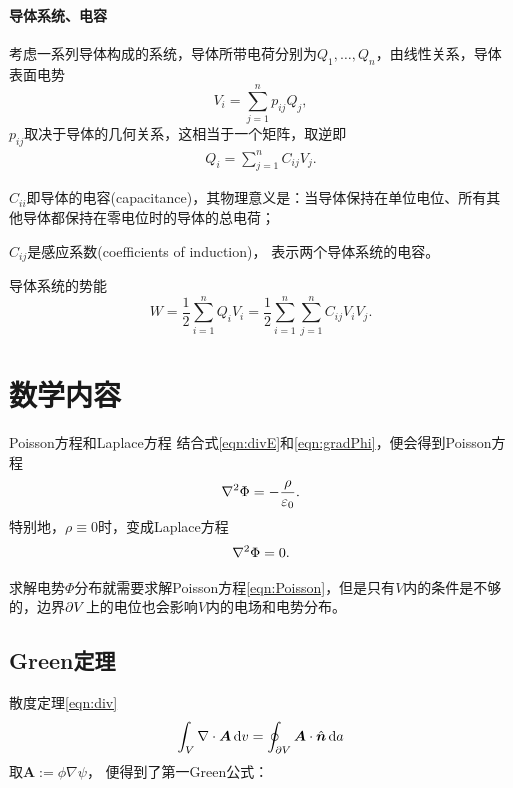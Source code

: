 \paragraph{导体系统、电容}
考虑一系列导体构成的系统，导体所带电荷分别为$Q_1,\ldots,Q_n$，由线性关系，导体表面电势
\[
    V_i=\sum_{j=1}^np_{ij}Q_j,
\]
$p_{ij}$取决于导体的几何关系，这相当于一个矩阵，取逆即
\begin{align}
    Q_i=\sum_{j=1}^nC_{ij}V_j.
\end{align}
\begin{compactitem}
	\item $C_{ii}$即导体的电容(capacitance)，其物理意义是：当导体保持在单位电位、所有其他导体都保持在零电位时的导体的总电荷；
	\item $C_{ij}$是感应系数(coefficients of induction)，%
    表示两个导体系统的电容。
\end{compactitem}
导体系统的势能
\[
    W=\frac12\sum_{i=1}^nQ_iV_i=\frac12\sum_{i=1}^n\sum_{j=1}^nC_{ij}V_iV_j.
\]

\section{数学内容}

\begin{definition}
    {Poisson方程和Laplace方程}{}
    结合式\eqref{eqn:divE}和\eqref{eqn:gradPhi}，便会得到Poisson方程
    \begin{align}
        \label{eqn:Poisson}
        \nabla^2\Phi=-\frac\rho{\varepsilon_0}.
    \end{align}
    特别地，$\rho\equiv 0$时，变成Laplace方程
    \begin{align}
        \label{eqn:Laplace}
        \nabla^2\Phi=0.
    \end{align}
\end{definition}
求解电势$\Phi$分布就需要求解Poisson方程\eqref{eqn:Poisson}，但是只有$V$内的条件是不够的，边界$\partial V$上的电位也会影响$V$内的电场和电势分布。

\subsection{Green定理}

散度定理\eqref{eqn:div}
\[
    \int_V\nabla\cdot\bm A\mathop{}\!\mathrm{d} v=\oint_{\partial V}\bm A\cdot\mathop{}\!\hat{\bm{n}}\mathop{}\!\mathrm{d} a
\]
取$\bm A:=\phi\nabla\psi$，
便得到了第一Green公式：

